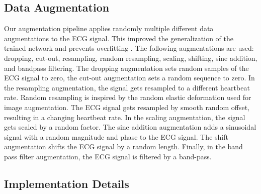 \subsection{Data Augmentation} \label{subsec:data_augmentation}

Our augmentation pipeline applies randomly multiple different data augmentations to the ECG signal. This improved the generalization of the trained network and prevents overfitting \cite{Perez2017, Nonaka2020, Hatamian2020}. The following augmentations are used: dropping, cut-out, resampling, random resampling, scaling, shifting, sine addition, and bandpass filtering. The dropping augmentation sets random samples of the ECG signal to zero, the cut-out augmentation sets a random sequence to zero. In the resampling augmentation, the signal gets resampled to a different heartbeat rate. Random resampling is inspired by the random elastic deformation \cite{Simard2003, Ronneberger2015, Reich2020a} used for image augmentation. The ECG signal gets resampled by smooth random offset, resulting in a changing heartbeat rate. In the scaling augmentation, the signal gets scaled by a random factor. The sine addition augmentation adds a sinusoidal signal with a random magnitude and phase to the ECG signal. The shift augmentation shifts the ECG signal by a random length. Finally, in the band pass filter augmentation, the ECG signal is filtered by a band-pass.

\subsection{Implementation Details} \label{subsec:implementation}

